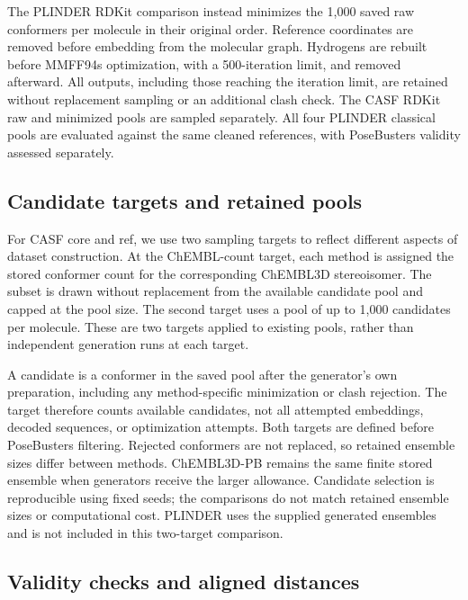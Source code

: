 The PLINDER RDKit comparison instead minimizes the 1,000 saved raw conformers per molecule
in their original order. Reference coordinates are removed before embedding from the molecular
graph. Hydrogens are rebuilt before MMFF94s optimization, with a 500-iteration limit,
and removed afterward. All outputs, including those reaching the iteration limit, are
retained without replacement sampling or an additional clash check. The CASF RDKit
raw and minimized pools are sampled separately. All four PLINDER classical pools are
evaluated against the same cleaned references, with PoseBusters validity assessed separately.

\subsection*{Candidate targets and retained pools}

For CASF core and ref, we use two sampling targets to reflect different aspects of dataset construction. At the
ChEMBL-count target, each method is assigned the stored conformer count for the corresponding
ChEMBL3D stereoisomer. The subset is drawn without replacement from the available candidate pool and
capped at the pool size. The second target uses a pool of up to 1,000 candidates per molecule. These
are two targets applied to existing pools, rather than independent generation runs at each target.

A candidate is a conformer in the saved pool after the generator's own preparation,
including any method-specific minimization or clash rejection. The target therefore counts
available candidates, not all attempted embeddings, decoded sequences, or optimization attempts.
Both targets are defined before PoseBusters filtering. Rejected conformers are not replaced, so
retained ensemble sizes differ between methods. ChEMBL3D-PB remains the same finite stored
ensemble when generators receive the larger allowance. Candidate selection is reproducible using
fixed seeds; the comparisons do not match retained ensemble sizes or computational cost.
PLINDER uses the supplied generated ensembles and is not included in this two-target comparison.

\subsection*{Validity checks and aligned distances}

